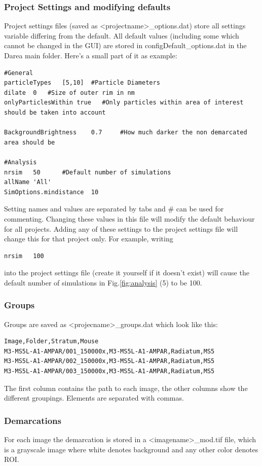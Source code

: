 \documentclass[12pt, a4paper]{scrartcl}
\begin{document}
\subsubsection{Project Settings and modifying defaults}
Project settings files (saved as <projectname>\_options.dat) store all settings variable differing from the default.
All default values (including some which cannot be changed in the GUI) are stored in configDefault\_options.dat in the Darea main folder. Here's a small part of it as example:
\begin{lstlisting}[belowskip=0pt,breaklines=true]
#General
particleTypes	[5,10] 	#Particle Diameters
dilate	0	#Size of outer rim in nm
onlyParticlesWithin	true   #Only particles within area of interest should be taken into account

BackgroundBrightness	0.7 	#How much darker the non demarcated area should be

#Analysis
nrsim	50      #Default number of simulations
allName	'All'
SimOptions.mindistance	10
\end{lstlisting}
Setting names and values are separated by tabs and \# can be used for commenting.
Changing these values in this file will modify the default behaviour for all projects. Adding any of these settings to the project settings file will change this for that project only.
For example, writing
\begin{lstlisting}[belowskip=0pt]
nrsim	100
\end{lstlisting}
into the project settings file (create it yourself if it doesn't exist) will cause the default number of simulations in Fig.\ref{fig:analysis} (5) to be 100.

\subsubsection{Groups}
Groups are saved as <projecname>\_groups.dat which look like this:
\begin{lstlisting}[belowskip=0pt]
Image,Folder,Stratum,Mouse
M3-MS5L-A1-AMPAR/001_150000x,M3-MS5L-A1-AMPAR,Radiatum,MS5
M3-MS5L-A1-AMPAR/002_150000x,M3-MS5L-A1-AMPAR,Radiatum,MS5
M3-MS5L-A1-AMPAR/003_150000x,M3-MS5L-A1-AMPAR,Radiatum,MS5
\end{lstlisting}
The first column contains the path to each image, the other columns show the different groupings.
Elements are separated with commas.

\subsubsection{Demarcations}
For each image the demarcation is stored in a <imagename>\_mod.tif file, which is a grayscale image where white denotes background and any other color denotes ROI.
\end{document}
